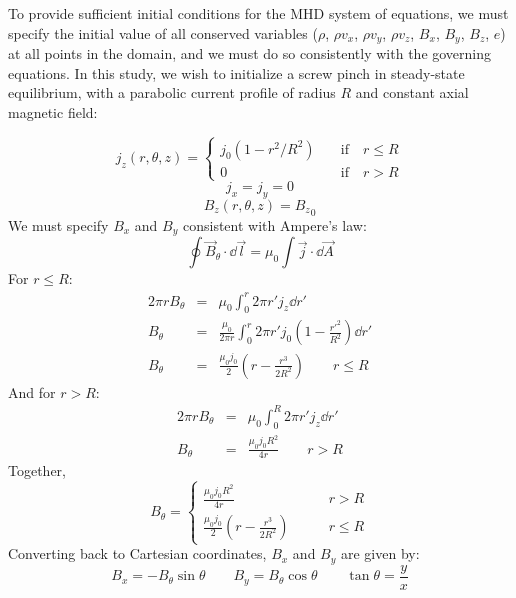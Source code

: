 \documentclass[%
 reprint,
 amsmath,amssymb,
 aps,
]{revtex4-2}
\begin{document}
To provide sufficient initial conditions for the MHD system of equations, we must specify the initial value of all conserved variables ($\rho$, $\rho v_x$, $\rho v_y$, $\rho v_z$, $B_x$, $B_y$, $B_z$, $e$) at all points in the domain, and we must do so consistently with the governing equations. In this study, we wish to initialize a screw pinch in steady-state equilibrium, with a parabolic current profile of radius $R$ and constant axial magnetic field:

\begin{equation}
j _z(r, \theta, z) = \begin{cases} j_0(1 - r^2/R^2 ) \quad & \text{if} \quad r \leq R \\
0 \quad  &\text{if} \quad r > R
\end{cases}
\end{equation}
\begin{equation}
j_x = j_y = 0
\end{equation}
\begin{equation}
B_z(r, \theta, z) = {B_z}_0
\end{equation}
We must specify $B_x$ and $B_y$ consistent with Ampere's law:
\begin{equation}
\oint \vec B_\theta \cdot \dd \vec l = \mu_0 \int \vec j \cdot \dd \vec A
\end{equation}
For $r \leq R$:
\begin{eqnarray}
2 \pi r B_\theta & = & \mu_0 \int _0 ^r 2 \pi r' j_z \dd r' \\
B_\theta & = & \frac{\mu_0}{2 \pi r} \int_0 ^r 2 \pi r' j_0 \left( 1 - \frac{{r'}^2}{R^2} \right) \dd r' \\
B_\theta & = & \frac{\mu_0 j_0}{2} \left( r - \frac{r^3}{2 R^2} \right) \qquad r \leq R
\end{eqnarray}
And for $r > R$:
\begin{eqnarray}
2 \pi r B_\theta & = & \mu_0 \int _0 ^R 2 \pi r' j_z \dd r' \\
B_\theta & = & \frac{\mu_0 j_0 R^2}{4 r} \qquad r > R
\end{eqnarray}
Together,
\begin{equation}
 B_\theta = \begin{cases}\frac{\mu_0 j_0 R^2}{4 r} & \qquad r > R \\ \frac{\mu_0 j_0}{2} \left( r - \frac{r^3}{2 R^2} \right) & \qquad r \leq R \end{cases}   
\end{equation}
Converting back to Cartesian coordinates, $B_x$ and $B_y$ are given by:
\begin{equation}
B_x = - B_\theta \sin \theta \qquad B_y = B_\theta \cos \theta \qquad \tan \theta = \frac{y}{x}
\end{equation}
\end{document}
